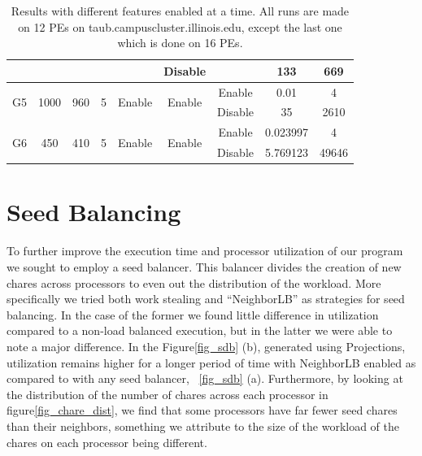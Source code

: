 \documentclass[10pt,twoside]{article}
\begin{document}
\begin{table}[h]
{\begin{tabular}{|c|c|c|c|c|c|c|c|c|}
                        &                       &                      &                     &                         & Disable                 &                         & 133                & 669      \\ \hline
    \multirow{2}{*}{G5} & \multirow{2}{*}{1000} & \multirow{2}{*}{960} & \multirow{2}{*}{5}  & \multirow{2}{*}{Enable} & \multirow{2}{*}{Enable} & Enable                  & 0.01               & 4        \\ \cline{7-9} 
                        &                       &                      &                     &                         &                         & Disable                 & 35                 & 2610     \\ \hline
    \multirow{2}{*}{G6} & \multirow{2}{*}{450}  & \multirow{2}{*}{410} & \multirow{2}{*}{5}  & \multirow{2}{*}{Enable} & \multirow{2}{*}{Enable} & Enable                  & 0.023997           & 4        \\ \cline{7-9} 
                        &                       &                      &                     &                         &                         & Disable                 & 5.769123           & 49646    \\ \hline
    \end{tabular}
  }
\caption{Results with different features enabled at a time. All runs are made on 12 PEs on taub.campuscluster.illinois.edu, except the last one which is done on 16 PEs.}
\label{tb:2}
\end{table}


\section{Seed Balancing}
To further improve the execution time and processor utilization of our program
  we sought to employ a seed balancer. This balancer divides the creation of
  new chares across processors to even out the distribution of the workload.
  More specifically we tried both work stealing and ``NeighborLB'' as strategies
  for seed balancing. In the case of the former we found little difference in
    utilization compared to a non-load balanced execution, but in the latter we
      were able to note a major difference. In the Figure\ref{fig_sdb} (b), generated
      using Projections, utilization remains higher for a longer period of time
      with NeighborLB enabled as compared to with any seed balancer,
           ~\ref{fig_sdb} (a).  Furthermore, by looking at the distribution of
             the number of chares across each processor in figure\ref{fig_chare_dist}, we
             find that some processors have far fewer seed chares than their
             neighbors, something we attribute to the size of the workload of
             the chares on each processor being different.
\end{document}
